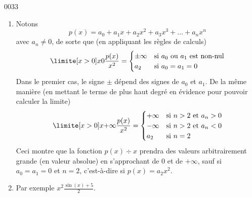 
\begin{corrige}{0033}

\begin{enumerate}
\item Notons
  \begin{equation*}
    p(x) = a_0 + a_1 x + a_2 x^2 + a_3 x^3 + \ldots + a_n x^n
  \end{equation*}
  avec $a_n \neq 0$, de sorte que (en appliquant les règles de
  calculs)
  \begin{equation*}
    \limite[x > 0] x 0 \frac{p(x)}{x^2} =
    \begin{cases}
      \pm\infty & \text{si $a_0$ ou $a_1$ est non-nul}\\
      a_2 & \text{si $a_0 = a_1 = 0$}
    \end{cases}
  \end{equation*}
	Dans le premier cas, le signe $\pm$ dépend des signes de $a_0$ et $a_1$.
  De la même manière (en mettant le terme de plus haut degré en
  évidence pour pouvoir calculer la limite)
  \begin{equation*}
    \limite[x > 0] x {+\infty} \frac{p(x)}{x^2} =
    \begin{cases}
      +\infty & \text{si $n > 2$ et $a_n > 0$}\\
      -\infty & \text{si $n > 2$ et $a_n < 0$}\\
      a_2 & \text{si $n = 2$}
    \end{cases}
  \end{equation*}
  Ceci montre que la fonction $p(x) \div x$ prendra des valeurs
  arbitrairement grande (en valeur absolue) en s'approchant de $0$ et
  de $+\infty$, sauf si $a_0 = a_1 = 0$ et $n = 2$, c'est-à-dire si
  $p(x) = a_2 x^2$.

\item Par exemple $x^2 {\frac{\sin(x)+ 5}{2}}$.
\end{enumerate}

\end{corrige}
